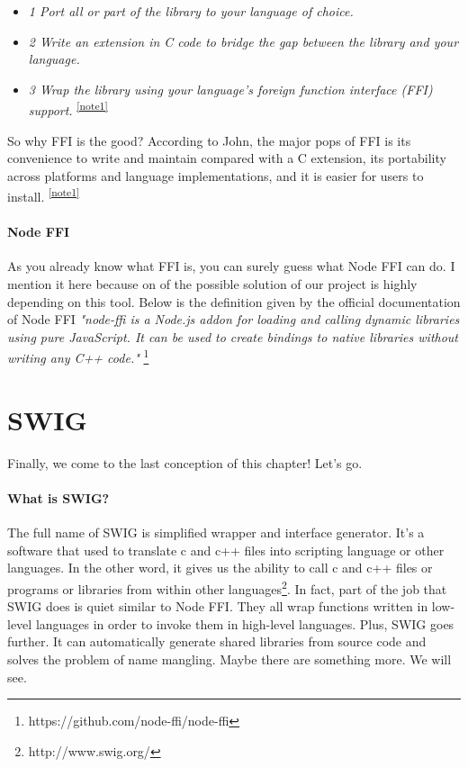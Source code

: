         \begin{itemize}
            
            \item \textit{1 Port all or part of the library to your language of choice.}
            \item \textit{2 Write an extension in C code to bridge the gap between the library and your language.}
            \item \textit{3 Wrap the library using your language's foreign function interface (FFI) support. }
           \textsuperscript{\ref{note1}}\newline
        \end{itemize}
    
    So why FFI is the good? According to John, the major pops of FFI is its convenience to write and maintain compared with a C extension, its portability across platforms and language implementations, and it is easier for users to install. \textsuperscript{\ref{note1}}
    
    
    \paragraph{Node FFI}
    As you already know what FFI is, you can surely guess what Node FFI can do. I mention it here because on of the possible solution of our project is highly depending on this tool. Below is the definition given by the official documentation of Node FFI \textit{"node-ffi is a Node.js addon for loading and calling dynamic libraries using pure JavaScript. It can be used to create bindings to native libraries without writing any C++ code."} \footnote{https://github.com/node-ffi/node-ffi}


\section{SWIG}
    Finally, we come to the last conception of this chapter! Let's go.
    \paragraph{What is SWIG?} The full name of SWIG is simplified wrapper and interface generator. It's a software that used to translate c and c++ files into scripting language or other languages. In the other word, it gives us the ability to call c and c++ files or programs or libraries from within other languages\footnote{http://www.swig.org/}.
    In fact, part of the job that SWIG does is quiet similar to Node FFI. They all wrap functions written in low-level languages in order to invoke them in high-level languages. Plus, SWIG goes further. It can automatically generate shared libraries from source code and solves the problem of name mangling. Maybe there are something more. We will see. 
    
